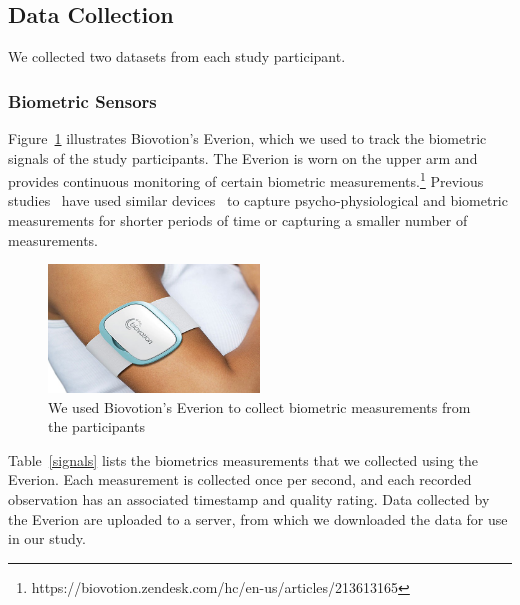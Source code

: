 \subsection{Data Collection}
\label{sec:DataCol}
We collected two datasets  from each study participant.

\subsubsection{Biometric Sensors}
Figure~\ref{everion} illustrates Biovotion's Everion, which we used to track the biometric signals of the study participants. The Everion is worn on the upper arm and provides continuous monitoring of certain biometric measurements.\footnote{https://biovotion.zendesk.com/hc/en-us/articles/213613165} Previous studies~\cite{zuger18,sano2013stress,healey2005detecting,wijsman2011towards,zuger2015interruptibility,goyal2017intelligent} have used similar devices~\cite{Okada11,polar,fitbitCharge} to capture psycho-physiological and biometric measurements for shorter periods of time or capturing a smaller number of measurements.

\begin{figure}
  \centering
      \includegraphics[width=0.5\textwidth]{Everion.jpg}
  \caption{We used Biovotion's Everion to collect biometric measurements from the participants}
   \label{everion}
\end{figure}

Table~\ref{signals} lists the biometrics measurements that we collected using the Everion. Each measurement is collected once per second, and each recorded observation has an associated timestamp and quality rating. Data collected by the Everion are uploaded to a server, from which we downloaded the data for use in our study.

